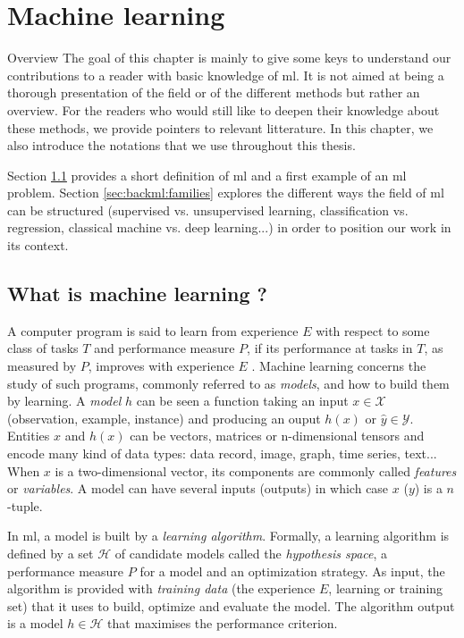 \chapter{Machine learning}
\label{chap:backml}

\begin{overview}{Overview}
The goal of this chapter is mainly to give some keys to understand our contributions to a reader with basic knowledge of \acrlong{ml}. It is not aimed at being a thorough presentation of the field or of the different methods but rather an overview. For the readers who would still like to deepen their knowledge about these methods, we provide pointers to relevant litterature. In this chapter, we also introduce the notations that we use throughout this thesis. 

Section \ref{sec:backml:whatisml} provides a short definition of \acrlong{ml} and a first example of an \acrshort{ml} problem. Section \ref{sec:backml:families} explores the different ways the field of \acrlong{ml} can be structured (\eg supervised vs. unsupervised learning, classification vs. regression, classical machine vs. deep learning...) in order to position our work in its context.   
\end{overview}

\section{What is machine learning ?} 
\label{sec:backml:whatisml}

A computer program is said to learn from experience $E$ with respect to some class of tasks $T$ and performance measure $P$, if its performance at tasks in $T$, as measured by $P$, improves with experience $E$ \parencite{mitchell1997machine}. Machine learning concerns the study of such programs, commonly referred to as \textit{models}, and how to build them by learning. A \textit{model} $h$ can be seen a function taking an input $x \in \mathcal{X}$ (\aka observation, example, instance) and producing an ouput $h(x)$ or $\hat{y} \in \mathcal{Y}$. Entities $x$ and $h(x)$ can be vectors, matrices or n-dimensional tensors and encode many kind of data types: data record, image, graph, time series, text... When $x$ is a two-dimensional vector, its components are commonly called \textit{features} or \textit{variables}. A model can have several inputs (\resp outputs) in which case $x$ (\resp $y$) is a $n$-tuple.

In \acrlong{ml}, a model is built by a \textit{learning algorithm}. Formally, a learning algorithm is defined by a set $\mathcal{H}$ of candidate models called the \textit{hypothesis space}, a performance measure $P$ for a model and an optimization strategy. As input, the algorithm is provided with \textit{training data} (the experience $E$, \aka learning or training set) that it uses to build, optimize and evaluate the model. The algorithm output is a model $h \in \mathcal{H}$ that maximises the performance criterion. 


